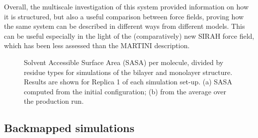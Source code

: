Overall, the multiscale investigation of this system provided information on how it is structured, but also a useful comparison between force fields, proving how the same system can be described in different ways from different models. This can be useful especially in the light of the (comparatively) new SIRAH force field, which has been less assessed than the MARTINI description.
%
\begin{figure}[t!]
\centering
{} 
\caption[SASA per residue of monolayer and bilater]{Solvent Accessible Surface Area (SASA) per molecule, divided by residue types for simulations of the bilayer and monolayer structure. Results are shown for Replica 1 of each simulation set-up. (a) SASA computed from the initial configuration; (b) from the average over the production run.}
\label{fig:mono_bi_sasa}
\end{figure}


\subsection{Backmapped simulations} 

